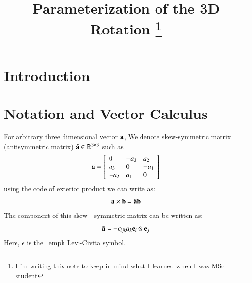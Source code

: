

\title{Parameterization of the 3D Rotation \footnote{I 'm writing this note to keep in mind what I learned when I was MSc student}}


\maketitle
\tableofcontents


\section{Introduction}


\section{Notation and Vector Calculus}

For arbitrary three dimensional vector $\mathbf{a}$, We denote skew-symmetric matrix (antisymmetric matrix) $\tilde{\mathbf{a}}\in\mathbb{R}^{3\times 3}$ such as
%
\begin{eqnarray}
\tilde{\mathbf{a}}=\left[\begin{array}{lll}0 & -a_3 & a_2 \\ a_3 & 0 & -a_1 \\ -a_2 & a_1 & 0 \end{array}\right]
\end{eqnarray}
%
using the code of exterior product we can write as:
%
\begin{equation}
\mathbf{a}\times\mathbf{b} = \tilde{\mathbf{a}}\mathbf{b}
\end{equation}
%
The component of this skew - symmetric matrix can be written as:
%
\begin{equation}
\tilde{\mathbf{a}} = -\epsilon_{ijk}a_k \mathbf{e}_i\otimes\mathbf{e}_j
\end{equation}
%
Here, $\epsilon$ is the \ emph {Levi-Civita symbol}.

